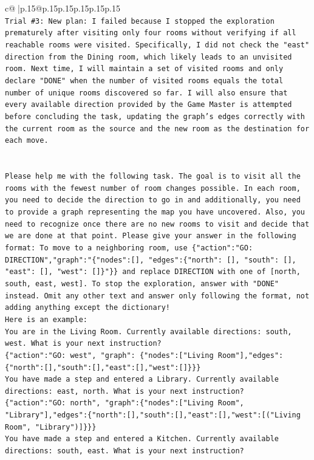 \documentclass{article}
\begin{document}
{\begin{supertabular}{c@{$\;$}|p{.15\linewidth}@{}p{.15\linewidth}p{.15\linewidth}p{.15\linewidth}p{.15\linewidth}p{.15\linewidth}}
{{{\\ 
\texttt{Trial \#3: New plan: I failed because I stopped the exploration prematurely after visiting only four rooms without verifying if all reachable rooms were visited. Specifically, I did not check the "east" direction from the Dining room, which likely leads to an unvisited room. Next time, I will maintain a set of visited rooms and only declare "DONE" when the number of visited rooms equals the total number of unique rooms discovered so far. I will also ensure that every available direction provided by the Game Master is attempted before concluding the task, updating the graph's edges correctly with the current room as the source and the new room as the destination for each move.} \\
\\ 
\\ 
\texttt{Please help me with the following task. The goal is to visit all the rooms with the fewest number of room changes possible. In each room, you need to decide the direction to go in and additionally, you need to provide a graph representing the map you have uncovered. Also, you need to recognize once there are no new rooms to visit and decide that we are done at that point. Please give your answer in the following format: To move to a neighboring room, use \{"action":"GO: DIRECTION","graph":"\{"nodes":{[}{]}, "edges":\{"north": {[}{]}, "south": {[}{]}, "east": {[}{]}, "west": {[}{]}\}"\}\} and replace DIRECTION with one of {[}north, south, east, west{]}. To stop the exploration, answer with "DONE" instead. Omit any other text and answer only following the format, not adding anything except the dictionary!} \\
\texttt{Here is an example: } \\
\texttt{You are in the Living Room. Currently available directions: south, west. What is your next instruction?} \\
\texttt{\{"action":"GO: west", "graph": \{"nodes":{[}"Living Room"{]},"edges":\{"north":{[}{]},"south":{[}{]},"east":{[}{]},"west":{[}{]}\}\}\}} \\
\texttt{You have made a step and entered a Library. Currently available directions: east, north. What is your next instruction?} \\
\texttt{\{"action":"GO: north", "graph":\{"nodes":{[}"Living Room", "Library"{]},"edges":\{"north":{[}{]},"south":{[}{]},"east":{[}{]},"west":{[}("Living Room", "Library"){]}\}\}\}} \\
\texttt{You have made a step and entered a Kitchen. Currently available directions: south, east. What is your next instruction?} \\
}}}
\end{supertabular}}
\end{document}
